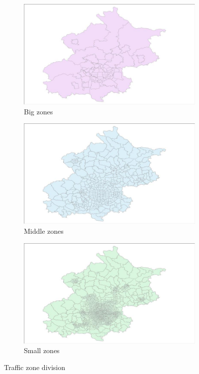 \documentclass{article}
\begin{document}
\begin{figure}[H]
  \centering
  \begin{subfigure}[b]{.3\textwidth}
  	\centering
  	\includegraphics[width=\linewidth]{./images/big_traffic_zone.jpg}
  	\caption{Big zones}
  \end{subfigure}
  \begin{subfigure}[b]{.3\textwidth}
  	\centering
  	\includegraphics[width=\linewidth]{./images/middle_traffic_zone.jpg}
  	\caption{Middle zones}
  \end{subfigure}
  \begin{subfigure}[b]{.3\textwidth}
  	\centering
  	\includegraphics[width=\linewidth]{./images/small_traffic_zone.jpg}
  	\caption{Small zones}
  \end{subfigure}
  \caption{Traffic zone division}
  	\label{fig:data/traffic_zones}
\end{figure}
\end{document}
